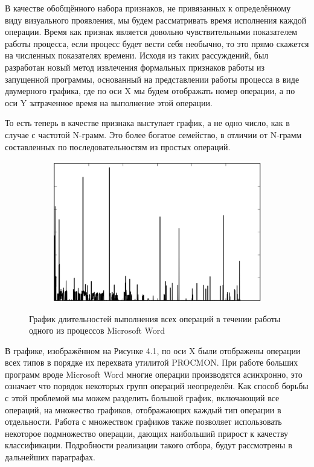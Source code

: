 В качестве обобщённого набора признаков, не привязанных к определённому виду визуального проявления, мы будем рассматривать время исполнения каждой операции. Время как признак является довольно чувствительными показателем работы процесса, если процесс будет вести себя необычно, то это прямо скажется на численных показателях времени. Исходя из таких рассуждений, был разработан новый метод извлечения формальных признаков работы из запущенной программы, основанный на представлении работы процесса в виде двумерного графика, где по оси X мы будем отображать номер операции, а по оси Y затраченное время на выполнение этой операции. 

То есть теперь в качестве признака выступает график, а не одно число, как в случае с частотой N-грамм. Это более богатое семейство, в отличии от N-грамм составленных по последовательностям из простых операций.

\begin{figure}[ht]
	\centering
    \begin{subfigure}[b]{1\textwidth}
    \centering
        \includegraphics[scale=0.5]{pasted-image-29.png}
    \end{subfigure}
 
    \caption{График длительностей выполнения всех операций в течении работы одного из процессов Microsoft Word}
    \label{fig_parsetree}
\end{figure}

В графике, изображённом на Рисунке 4.1, по оси X были отображены операции всех типов в порядке их перехвата утилитой PROCMON. При работе больших программ вроде Microsoft Word многие операции производятся асинхронно, это означает что порядок некоторых групп операций неопределён. Как способ борьбы с этой проблемой мы можем разделить большой график, включающий все операций, на множество графиков, отображающих каждый тип операции в отдельности. Работа с множеством графиков также позволяет использовать некоторое подмножество операции, дающих наибольший прирост к качеству классификации. Подробности реализации такого отбора, будут рассмотрены в дальнейших параграфах.


